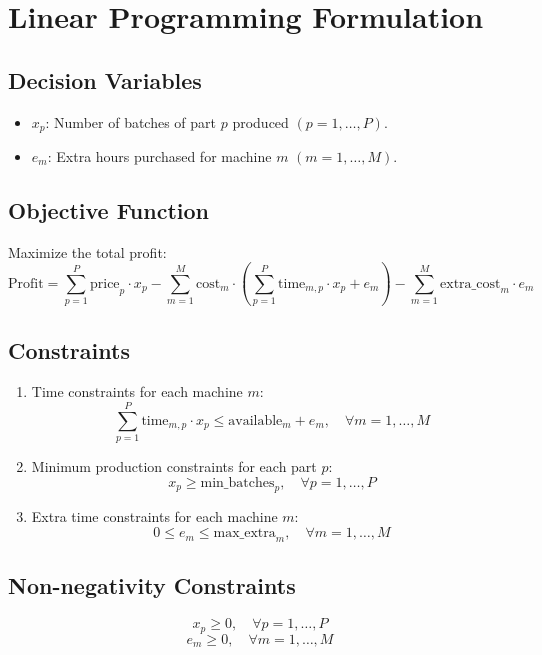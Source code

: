\documentclass{article}
\begin{document}
\section*{Linear Programming Formulation}

\subsection*{Decision Variables}
\begin{itemize}
    \item \( x_p \): Number of batches of part \( p \) produced \((p = 1, \ldots, P)\).
    \item \( e_m \): Extra hours purchased for machine \( m \) \((m = 1, \ldots, M)\).
\end{itemize}

\subsection*{Objective Function}
Maximize the total profit:
\[
\text{Profit} = \sum_{p=1}^{P} \text{price}_p \cdot x_p - \sum_{m=1}^{M} \text{cost}_m \cdot \left(\sum_{p=1}^{P} \text{time}_{m,p} \cdot x_p + e_m \right) - \sum_{m=1}^{M} \text{extra\_cost}_m \cdot e_m
\]

\subsection*{Constraints}
\begin{enumerate}
    \item Time constraints for each machine \( m \):
    \[
    \sum_{p=1}^{P} \text{time}_{m,p} \cdot x_p \leq \text{available}_m + e_m, \quad \forall m = 1, \ldots, M
    \]
    
    \item Minimum production constraints for each part \( p \):
    \[
    x_p \geq \text{min\_batches}_p, \quad \forall p = 1, \ldots, P
    \]

    \item Extra time constraints for each machine \( m \):
    \[
    0 \leq e_m \leq \text{max\_extra}_m, \quad \forall m = 1, \ldots, M
    \]
\end{enumerate}

\subsection*{Non-negativity Constraints}
\[
x_p \geq 0, \quad \forall p = 1, \ldots, P
\]
\[
e_m \geq 0, \quad \forall m = 1, \ldots, M
\]
\end{document}

